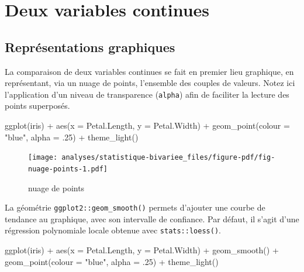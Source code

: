 \documentclass[
  letterpaper,
  DIV=11,
  numbers=noendperiod,
  oneside]{scrreprt}
\newenvironment{Shaded}{\begin{snugshade}}{\end{snugshade}}
\newcommand{\AttributeTok}[1]{\textcolor[rgb]{0.40,0.45,0.13}{#1}}
\newcommand{\DecValTok}[1]{\textcolor[rgb]{0.68,0.00,0.00}{#1}}
\newcommand{\FunctionTok}[1]{\textcolor[rgb]{0.28,0.35,0.67}{#1}}
\newcommand{\NormalTok}[1]{\textcolor[rgb]{0.00,0.23,0.31}{#1}}
\newcommand{\SpecialCharTok}[1]{\textcolor[rgb]{0.37,0.37,0.37}{#1}}
\newcommand{\StringTok}[1]{\textcolor[rgb]{0.13,0.47,0.30}{#1}}
\begin{document}
\hypertarget{sec-deux-variables-continues}{%
\section{Deux variables continues}\label{sec-deux-variables-continues}}

\hypertarget{repruxe9sentations-graphiques-2}{%
\subsection{Représentations
graphiques}\label{repruxe9sentations-graphiques-2}}

La comparaison de deux variables continues se fait en premier lieu
graphique, en représentant, via un nuage de points, l'ensemble des
couples de valeurs. Notez ici l'application d'un niveau de transparence
(\texttt{alpha}) afin de faciliter la lecture des points superposés.

\begin{Shaded}
\begin{Highlighting}[]
\FunctionTok{ggplot}\NormalTok{(iris) }\SpecialCharTok{+}
  \FunctionTok{aes}\NormalTok{(}\AttributeTok{x =}\NormalTok{ Petal.Length, }\AttributeTok{y =}\NormalTok{ Petal.Width) }\SpecialCharTok{+}
  \FunctionTok{geom\_point}\NormalTok{(}\AttributeTok{colour =} \StringTok{"blue"}\NormalTok{, }\AttributeTok{alpha =}\NormalTok{ .}\DecValTok{25}\NormalTok{) }\SpecialCharTok{+}
  \FunctionTok{theme\_light}\NormalTok{()}
\end{Highlighting}
\end{Shaded}

\begin{figure}[H]

{\centering \texttt{[image: analyses/statistique-bivariee\_files/figure-pdf/fig-nuage-points-1.pdf]}

}

\caption{\label{fig-nuage-points}nuage de points}

\end{figure}

La géométrie \texttt{ggplot2::geom\_smooth()} permets d'ajouter une
courbe de tendance au graphique, avec son intervalle de confiance. Par
défaut, il s'agit d'une régression polynomiale locale obtenue avec
\texttt{stats::loess()}.

\begin{Shaded}
\begin{Highlighting}[]
\FunctionTok{ggplot}\NormalTok{(iris) }\SpecialCharTok{+}
  \FunctionTok{aes}\NormalTok{(}\AttributeTok{x =}\NormalTok{ Petal.Length, }\AttributeTok{y =}\NormalTok{ Petal.Width) }\SpecialCharTok{+}
  \FunctionTok{geom\_smooth}\NormalTok{() }\SpecialCharTok{+}
  \FunctionTok{geom\_point}\NormalTok{(}\AttributeTok{colour =} \StringTok{"blue"}\NormalTok{, }\AttributeTok{alpha =}\NormalTok{ .}\DecValTok{25}\NormalTok{) }\SpecialCharTok{+}
  \FunctionTok{theme\_light}\NormalTok{()}
\end{Highlighting}
\end{Shaded}
\end{document}
